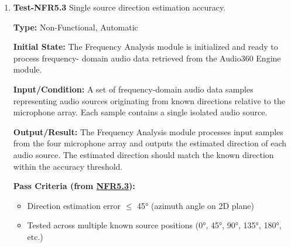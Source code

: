 \documentclass[12pt, titlepage]{article}
\begin{document}
\begin{enumerate}
\textbf{Type:} Non-Functional, Automatic

\textbf{Initial State:}
The Frequency Analysis module is initialized and ready to process frequency-
domain audio data retrieved from the Audio360 Engine module.

\textbf{Input/Condition:}
A set of frequency-domain audio data samples representing different known audio
classes. Each sample contains a single isolated audio source.

\textbf{Output/Result:}
The Frequency Analysis module processes each input sample and outputs the
predicted audio class. The predicted class should match the known class for each
sample.

\textbf{Pass Criteria (from \hyperref[SRS-NFR5_2]{NFR5.2}):}
\begin{itemize}
\item Classification accuracy $\geq$ 85\% per audio class
\item Tested across all supported audio classes (siren, smoke alarm, speech, 
etc.)
\end{itemize}

\textbf{How test will be performed:}
The test will be performed automatically by feeding the frequency domain data of
the known audio samples to the Frequency Analysis module. The predicted classes
will be compared against the known classes to calculate the classification
accuracy. The test passes if accuracy $\geq$ 90\% for each class.

\item{\textbf{Test-NFR5.3} Single source direction estimation accuracy.\\}

\textbf{Type:} Non-Functional, Automatic

\textbf{Initial State:}
The Frequency Analysis module is initialized and ready to process frequency-
domain audio data retrieved from the Audio360 Engine module.

\textbf{Input/Condition:}
A set of frequency-domain audio data samples representing audio sources
originating from known directions relative to the microphone array. Each sample
contains a single isolated audio source.

\textbf{Output/Result:}
The Frequency Analysis module processes input samples from the four microphone
array and outputs the estimated direction of each audio source. The estimated
direction should match the known direction within the accuracy threshold.

\textbf{Pass Criteria (from \hyperref[SRS-NFR5_3]{NFR5.3}):}
\begin{itemize}
\item Direction estimation error $\leq$ 45° (azimuth angle on 2D plane)
\item Tested across multiple known source positions (0°, 45°, 90°, 135°, 180°, etc.)
\end{itemize}


\end{enumerate}
\end{document}
